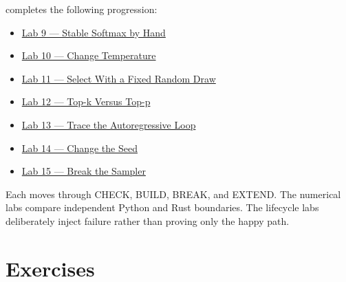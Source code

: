  completes the following progression:

\begin{itemize}
\tightlist
\item
  \href{https://github.com/hermonai/inside-the-llm-engine/blob/astra-visual-rewrite/labs/lab-09-stable-softmax-by-hand.md}{Lab
  9 --- Stable Softmax by Hand}
\item
  \href{https://github.com/hermonai/inside-the-llm-engine/blob/astra-visual-rewrite/labs/lab-10-temperature.md}{Lab
  10 --- Change Temperature}
\item
  \href{https://github.com/hermonai/inside-the-llm-engine/blob/astra-visual-rewrite/labs/lab-11-fixed-categorical-draw.md}{Lab
  11 --- Select With a Fixed Random Draw}
\item
  \href{https://github.com/hermonai/inside-the-llm-engine/blob/astra-visual-rewrite/labs/lab-12-top-k-vs-top-p.md}{Lab
  12 --- Top-k Versus Top-p}
\item
  \href{https://github.com/hermonai/inside-the-llm-engine/blob/astra-visual-rewrite/labs/lab-13-build-the-autoregressive-loop.md}{Lab
  13 --- Trace the Autoregressive Loop}
\item
  \href{https://github.com/hermonai/inside-the-llm-engine/blob/astra-visual-rewrite/labs/lab-14-change-the-seed.md}{Lab
  14 --- Change the Seed}
\item
  \href{https://github.com/hermonai/inside-the-llm-engine/blob/astra-visual-rewrite/labs/lab-15-break-the-sampler.md}{Lab
  15 --- Break the Sampler}
\end{itemize}

Each moves through CHECK, BUILD, BREAK, and EXTEND. The numerical labs
compare independent Python and Rust boundaries. The lifecycle labs
deliberately inject failure rather than proving only the happy path.

\section{Exercises}\label{exercises-3}

